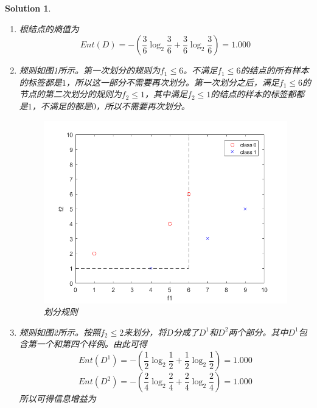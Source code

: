 \documentclass[a4paper,UTF8]{article}
\numberwithin{equation}{section}
\newtheorem*{solution}{Solution}
\begin{document}
 \begin{solution}
 ~\\
 \begin{enumerate}
 \item [(1)]
 根结点的熵值为
 \begin{equation}
 Ent(D) = -(\frac{3}{6}\log_2\frac{3}{6} + \frac{3}{6}\log_2\frac{3}{6}) = 1.000
 \end{equation}
 \item [(2)]
 规则如图1所示。第一次划分的规则为$f_1\leq 6$。不满足$f_1\leq 6$的结点的所有样本的标签都是$1$，所以这一部分不需要再次划分。第一次划分之后，满足$f_1\leq 6$的节点的第二次划分的规则为$f_2\leq 1$，其中满足$f_2\leq 1$的结点的样本的标签都都是$1$，不满足的都是$0$，所以不需要再次划分。
 \begin{figure}[!h]
 	\centering   
 	\includegraphics[scale=0.4]{coordinate1.png}  
 	\caption{划分规则} 
 	\label{coordinate1}
 \end{figure}
 \item [(3)]
 规则如图2所示。按照$f_2\leq 2$来划分，将$D$分成了$D^1$和$D^2$两个部分。其中$D^1$包含第一个和第四个样例。由此可得
 \begin{equation}
 Ent(D^1) =  -(\frac{1}{2}\log_2\frac{1}{2} + \frac{1}{2}\log_2\frac{1}{2}) = 1.000
 \end{equation}
 \begin{equation}
 Ent(D^2) = -(\frac{2}{4}\log_2\frac{2}{4} + \frac{2}{4}\log_2\frac{2}{4}) = 1.000
 \end{equation}
 所以可得信息增益为
 \begin{equation}
 \begin{aligned}

\end{aligned}
\end{equation}
\end{enumerate}
\end{solution}
\end{document}

